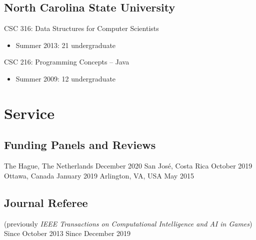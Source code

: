 \documentclass{cv}
\begin{document}
\subsection*{North Carolina State University}

CSC 316: Data Structures for Computer Scientists
\begin{itemize}
	\item Summer 2013: 21 undergraduate
\end{itemize}
CSC 216: Programming Concepts – Java
\begin{itemize}
	\item Summer 2009: 12 undergraduate
\end{itemize}


\section*{Service}

\subsection*{Funding Panels and Reviews}
	{The Hague, The Netherlands}
	{December 2020}
	{San José, Costa Rica}
	{October 2019}
	{Ottawa, Canada}
	{January 2019}
	{Arlington, VA, USA}
	{May 2015}

\subsection*{Journal Referee}
	{(previously {\em IEEE Transactions on Computational Intelligence and AI in Games})}
	{Since October 2013}
	{Since December 2019}
\end{document}
